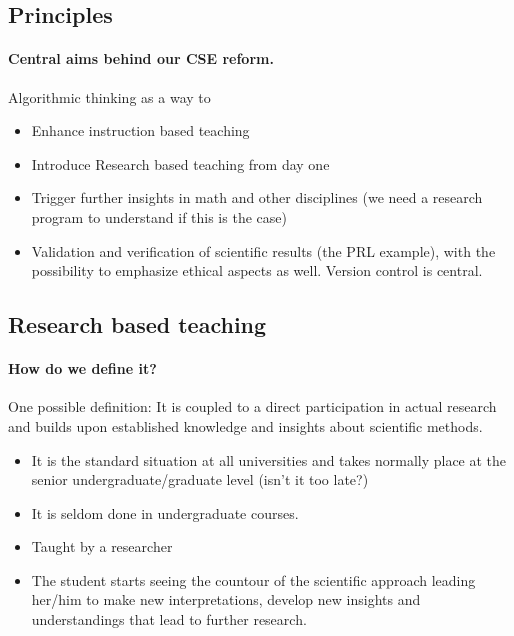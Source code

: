 \documentclass[%
twoside,                 %
final,                   %
10pt]{article}
\begin{document}
\noindent




\subsection*{Principles}

\paragraph{Central aims behind our CSE reform.}

Algorithmic  thinking as a way to

\begin{itemize}
\item Enhance instruction based teaching

\item Introduce Research based teaching  from day one

\item Trigger further insights in math and other disciplines (we need a research program to understand if this is the case)

\item Validation and verification of scientific results (the PRL example), with the possibility to emphasize ethical aspects as well. Version control is central.
\end{itemize}

\noindent





\subsection*{Research based teaching}

\paragraph{How do we define it?}
One possible definition: It is coupled to a direct participation in actual research and builds upon established
knowledge and insights about scientific methods.


\begin{itemize}
\item It is the standard situation at all universities  and takes normally place at the senior undergraduate/graduate level (isn't it too late?)

\item It is seldom done in undergraduate courses.

\item Taught by a researcher

\item The student starts seeing the countour of the scientific approach leading her/him to make new interpretations, develop new insights and understandings that lead  to further research.
\end{itemize}
\end{document}
